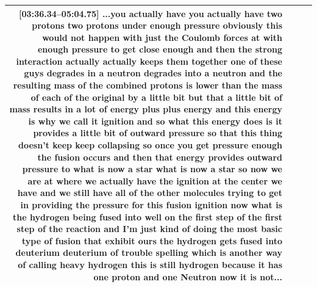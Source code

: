 \documentclass[10pt]{article}
\begin{document}
\begin{tiny}
\begin{longtable}{|r|p{0.375in}|p{1.275in}|p{3.5in}|}
                                                                                                                                                                                                                                                                                                                                                                                                                                                                                         \textbf{[03:36.34--05:04.75]} ...you actually have you actually have two protons two protons under enough pressure obviously this would not happen with just the Coulomb forces at with enough pressure to get close enough and then the strong interaction actually actually keeps them together one of these guys degrades in a neutron degrades into a neutron and the resulting mass of the combined protons is lower than the mass of each of the original by a little bit but that a little bit of mass results in a lot of energy plus plus energy and this energy is why we call it ignition and so what this energy does is it provides a little bit of outward pressure so that this thing doesn't keep keep collapsing so once you get pressure enough the fusion occurs and then that energy provides outward pressure to what is now a star what is now a star so now we are at where we actually have the ignition at the center we have and we still have all of the other molecules trying to get in providing the pressure for this fusion ignition now what is the hydrogen being fused into well on the first step of the first step of the reaction and I'm just kind of doing the most basic type of fusion that exhibit ours the hydrogen gets fused into deuterium deuterium of trouble spelling which is another way of calling heavy hydrogen this is still hydrogen because it has one proton and one Neutron now it is not... \\\hline

\end{longtable}
\end{tiny}
\end{document}
